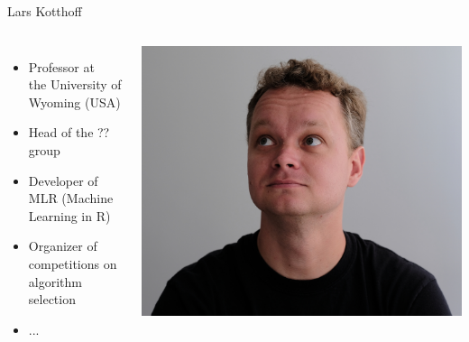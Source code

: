 \begin{frame}[c]{Lars Kotthoff}

\begin{columns}
	
	
	\begin{itemize}
		\item Professor at\\ the University of Wyoming (USA)
		\item Head of the ?? group
		\item Developer of MLR (Machine Learning in R)
		\item Organizer of competitions on algorithm selection
		\item ...
	\end{itemize}
	
	
	\includegraphics[width=1.0\textwidth]{images/kotthoff.jpg}
	
\end{columns}

\end{frame}
